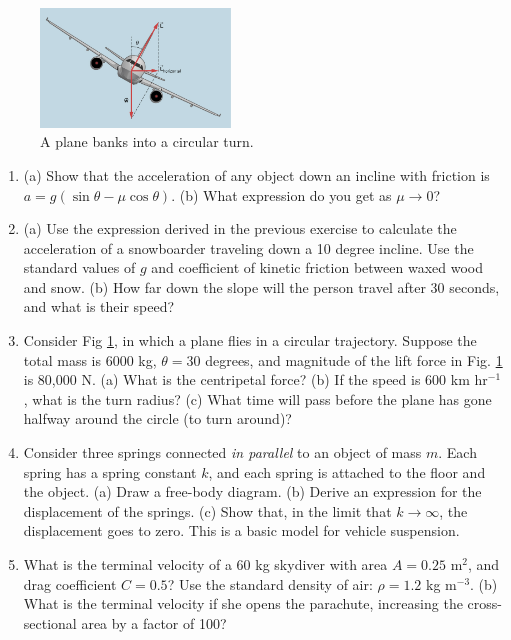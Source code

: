 \documentclass[10pt]{article}
\begin{document}
\begin{figure}
\centering
\includegraphics[width=0.45\textwidth]{plane.jpeg}
\caption{\label{fig:4} A plane banks into a circular turn.}
\end{figure}

\begin{enumerate}
\item (a) Show that the acceleration of any object down an incline with friction is $a=g(\sin\theta - \mu\cos\theta)$. (b) What expression do you get as $\mu \to 0$? \\ \vspace{2cm}
\item (a) Use the expression derived in the previous exercise to calculate the acceleration of a snowboarder traveling down a 10 degree incline.  Use the standard values of $g$ and coefficient of kinetic friction between waxed wood and snow. (b) How far down the slope will the person travel after 30 seconds, and what is their speed? \\ \vspace{3cm}
\item Consider Fig \ref{fig:4}, in which a plane flies in a circular trajectory. Suppose the total mass is 6000 kg, $\theta = 30$ degrees, and magnitude of the lift force in Fig. \ref{fig:4} is 80,000 N. (a) What is the centripetal force? (b) If the speed is 600 km hr$^{-1}$, what is the turn radius?  (c) What time will pass before the plane has gone halfway around the circle (to turn around)? \\ \vspace{3cm}
\item Consider three springs connected \textit{in parallel} to an object of mass $m$.  Each spring has a spring constant $k$, and each spring is attached to the floor and the object. (a) Draw a free-body diagram. (b) Derive an expression for the displacement of the springs. (c) Show that, in the limit that $k \to \infty$, the displacement goes to zero.  This is a basic model for vehicle suspension. \\ \vspace{3cm}
\item What is the terminal velocity of a 60 kg skydiver with area $A = 0.25$ m$^2$, and drag coefficient $C = 0.5$?  Use the standard density of air: $\rho = 1.2$ kg m$^{-3}$. (b) What is the terminal velocity if she opens the parachute, increasing the cross-sectional area by a factor of 100? \\ \vspace{3cm}
\end{enumerate}
\end{document}
